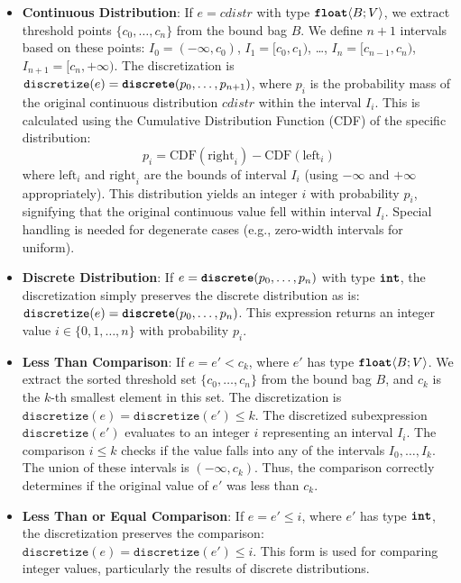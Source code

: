 \documentclass[acmsmall,screen,dvipsnames,x11names,nonacm,anonymous,review]{acmart}
\begin{document}
\begin{itemize}
    \item \textbf{Continuous Distribution}: If $e = cdistr$ with type $\text{\ttfamily\bfseries float}\langle B; V \rangle$, we extract threshold points $\{c_0, \dots, c_n\}$ from the bound bag $B$. We define $n+1$ intervals based on these points: $I_0 = (-\infty, c_0)$, $I_1 = [c_0, c_1)$, \dots, $I_n = [c_{n-1}, c_n)$, $I_{n+1} = [c_n, +\infty)$. The discretization is $\texttt{discretize}(e) = \text{\ttfamily\bfseries discrete}(p_0, \dots, p_{n+1})$, where $p_i$ is the probability mass of the original continuous distribution $cdistr$ within the interval $I_i$. This is calculated using the Cumulative Distribution Function (CDF) of the specific distribution:
    \[ p_i = \text{CDF}(\text{right}_i) - \text{CDF}(\text{left}_i) \]
    where $\text{left}_i$ and $\text{right}_i$ are the bounds of interval $I_i$ (using $-\infty$ and $+\infty$ appropriately). This \discrete{} distribution yields an integer $i$ with probability $p_i$, signifying that the original continuous value fell within interval $I_i$. Special handling is needed for degenerate cases (e.g., zero-width intervals for uniform).

    \item \textbf{Discrete Distribution}: If $e = \text{\ttfamily\bfseries discrete}(p_0, \ldots, p_n)$ with type $\text{\ttfamily\bfseries int}$, the discretization simply preserves the discrete distribution as is: $\texttt{discretize}(e) = \text{\ttfamily\bfseries discrete}(p_0, \ldots, p_n)$. This expression returns an integer value $i \in \{0, 1, \ldots, n\}$ with probability $p_i$.

    \item \textbf{Less Than Comparison}: If $e = e' < c_k$, where $e'$ has type $\text{\ttfamily\bfseries float}\langle B; V \rangle$. We extract the sorted threshold set $\{c_0, \dots, c_n\}$ from the bound bag $B$, and $c_k$ is the $k$-th smallest element in this set. The discretization is $\texttt{discretize}(e) = \texttt{discretize}(e') \leq k$. The discretized subexpression $\texttt{discretize}(e')$ evaluates to an integer $i$ representing an interval $I_i$. The comparison $i \leq k$ checks if the value falls into any of the intervals $I_0, \dots, I_k$. The union of these intervals is $(-\infty, c_k)$. Thus, the comparison correctly determines if the original value of $e'$ was less than $c_k$.

    \item \textbf{Less Than or Equal Comparison}: If $e = e' \leq i$, where $e'$ has type $\text{\ttfamily\bfseries int}$, the discretization preserves the comparison: $\texttt{discretize}(e) = \texttt{discretize}(e') \leq i$. This form is used for comparing integer values, particularly the results of discrete distributions.


\end{itemize}
\end{document}
